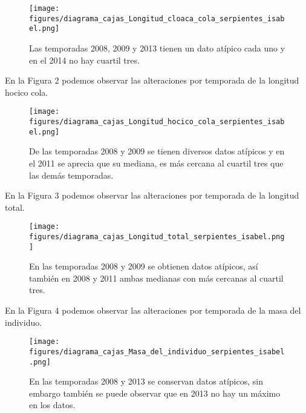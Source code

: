 \documentclass{article}
\begin{document}
\begin{figure}[H]
\centering
\caption{Las temporadas 2008, 2009 y 2013 tienen un dato atípico cada uno y en el 2014 no hay cuartil tres.}
\label{fig:pngBoxsplotLongitudTotal}
\texttt{[image: figures/diagrama\_cajas\_Longitud\_cloaca\_cola\_serpientes\_isabel.png]}
\end{figure}

En la Figura 2 podemos observar las alteraciones por temporada de la longitud hocico cola.

\begin{figure}[H]
\centering
\caption{De las temporadas 2008 y 2009 se tienen diversos datos atípicos y en el 2011 se aprecia que su mediana, es más cercana al cuartil tres que las demás temporadas.}
\label{fig:pngBoxsplotLongitudTotal}
\texttt{[image: figures/diagrama\_cajas\_Longitud\_hocico\_cola\_serpientes\_isabel.png]}
\end{figure}

En la Figura 3 podemos observar las alteraciones por temporada de la longitud total.

\begin{figure}[H]
\centering
\caption{En las temporadas 2008 y 2009 se obtienen datos atípicos, así también en 2008 y 2011 ambas medianas con más cercanas al cuartil tres.}
\label{fig:pngBoxsplotLongitudTotal}
\texttt{[image: figures/diagrama\_cajas\_Longitud\_total\_serpientes\_isabel.png]}
\end{figure}

En la Figura 4 podemos observar las alteraciones por temporada de la masa del individuo.

\begin{figure}[H]
\centering
\caption{En las temporadas 2008 y 2013 se conservan datos atípicos, sin embargo también se puede observar que en 2013 no hay un máximo en los datos.}
\label{fig:pngBoxsplotLongitudTotal}
\texttt{[image: figures/diagrama\_cajas\_Masa\_del\_individuo\_serpientes\_isabel.png]}
\end{figure}
\end{document}
